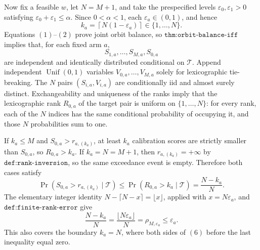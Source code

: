 Now fix a feasible \(w\), let \(N=M+1\), and take the prespecified levels \(\varepsilon_0,\varepsilon_1>0\) satisfying \(\varepsilon_0+\varepsilon_1\le\alpha\). Since \(0<\alpha<1\), each \(\varepsilon_a\in(0,1)\), and hence
\[
k_a=\left\lceil N(1-\varepsilon_a)\right\rceil\in\{1,\ldots,N\}.
\tag{5}
\]
Equations \((1)\)--\((2)\) prove joint orbit balance, so \(\texttt{thm:orbit-balance-iff}\) implies that, for each fixed arm \(a\),
\[
S_{1,a},\ldots,S_{M,a},S_{0,a}
\]
are independent and identically distributed conditional on \(\mathcal T\). Append independent \(\operatorname{Unif}(0,1)\) variables \(V_{0,a},\ldots,V_{M,a}\) solely for lexicographic tie-breaking. The \(N\) pairs \((S_{i,a},V_{i,a})\) are conditionally iid and almost surely distinct. Exchangeability and uniqueness of the ranks imply that the lexicographic rank \(R_{0,a}\) of the target pair is uniform on \(\{1,\ldots,N\}\): for every rank, each of the \(N\) indices has the same conditional probability of occupying it, and those \(N\) probabilities sum to one.

If \(k_a\le M\) and \(S_{0,a}>r_{a,(k_a)}\), at least \(k_a\) calibration scores are strictly smaller than \(S_{0,a}\), so \(R_{0,a}>k_a\). If \(k_a=N=M+1\), then \(r_{a,(k_a)}=+\infty\) by \(\texttt{def:rank-inversion}\), so the same exceedance event is empty. Therefore both cases satisfy
\[
\Pr(S_{0,a}>r_{a,(k_a)}\mid\mathcal T)\le\Pr(R_{0,a}>k_a\mid\mathcal T)=\frac{N-k_a}{N}.
\tag{6}
\]
The elementary integer identity \(N-\lceil N-x\rceil=\lfloor x\rfloor\), applied with \(x=N\varepsilon_a\), and \(\texttt{def:finite-rank-error}\) give
\[
\frac{N-k_a}{N}=\frac{\lfloor N\varepsilon_a\rfloor}{N}=\rho_{M,\varepsilon_a}\le\varepsilon_a.
\tag{7}
\]
This also covers the boundary \(k_a=N\), where both sides of \((6)\) before the last inequality equal zero.

